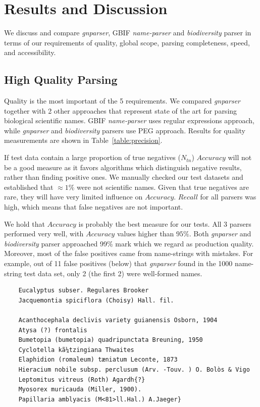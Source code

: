 \documentclass{bmcart}
\makeatletter
\newcommand{\verbatimfont}[1]{\def\verbatim@font{#1}}%
\makeatother
\begin{document}
\section*{Results and Discussion}\label{sec:discussion}

We discuss and compare \textit{gnparser}, GBIF \textit{name-parser} and
\textit{biodiversity} parser in terms of our requirements of
quality, global scope, parsing completeness, speed, and accessibility.


\subsection*{High Quality Parsing}

Quality is the most important of the 5 requirements.  We
compared \textit{gnparser} together with 2 other approaches that
represent state of the art for parsing biological scientific names. GBIF
\textit{name-parser} uses regular expressions approach, while \textit{gnparser}
and \textit{biodiversity} parsers use PEG approach.  Results for quality
measurements are shown in Table~\ref{table:precision}.

If test data contain a large proportion of true negatives ($N_{tn}$) $Accuracy$
will not be a good measure as it favors algorithms which distinguish negative
results, rather than finding positive ones. We manually checked our test
datasets and established that  $\approx1\%$ were not scientific names. Given
that true negatives are rare, they will have very limited influence on
$Accuracy$. $Recall$ for all parsers was high, which means that false negatives
are not important.

We hold that $Accuracy$ is probably the best measure for our tests. All 3
parsers performed very well, with $Accuracy$ values higher than $95\%$. Both
\textit{gnparser} and \textit{biodiversity} parser approached 99\% mark which
we regard as production quality. Moreover, most of the false positives came
from name-strings with mistakes. For example, out of 11 false positives (below)
that \textit{gnparser} found in the 1000 name-string test data set, only 2 (the
first 2) were well-formed names.

\vspace{0.5cm}

\verbatimfont{\bfseries\rmfamily\small}

\begin{verbatim}
    Eucalyptus subser. Regulares Brooker
    Jacquemontia spiciflora (Choisy) Hall. fil.

    Acanthocephala declivis variety guianensis Osborn, 1904
    Atysa (?) frontalis
    Bumetopia (bumetopia) quadripunctata Breuning, 1950
    Cyclotella kã¼tzingiana Thwaites
    Elaphidion (romaleum) tæniatum Leconte, 1873
    Hieracium nobile subsp. perclusum (Arv. -Touv. ) O. Bolòs & Vigo
    Leptomitus vitreus (Roth) Agardh{?}
    Myosorex muricauda (Miller, 1900).
    Papillaria amblyacis (M<81>ll.Hal.) A.Jaeger}
\end{verbatim}
\end{document}
